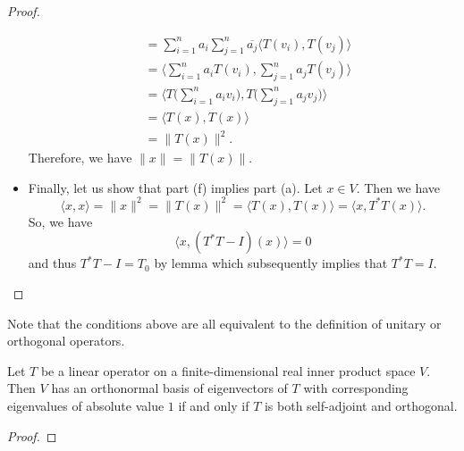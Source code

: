 \begin{proof}
\begin{itemize}
\begin{align*}
                          &= \sum_{ i=1  }^{ n } {a}_{i} \sum_{ j=1  }^{ n } \overline{{a}_{j}} \langle T({v}_{i}) , T({v}_{j}) \rangle \\
                          &= \Big\langle \sum_{ i=1  }^{ n } {a}_{i} T({v}_{i}),  \sum_{ j=1 }^{  n } {a}_{j} T({v}_{j}) \Big\rangle \\
                          &= \Big\langle T \Big(  \sum_{ i=1  }^{ n } {a}_{i} {v}_{i} \Big), T \Big(  \sum_{ j=1  }^{ n } {a}_{j} {v}_{j} \Big)  \Big\rangle \\
                          &= \langle T(x) , T(x) \rangle \\
                          &= \|T(x)\|^{2}.
            \end{align*}
            Therefore, we have \( \|x\| = \|T(x)\| \).
        \item Finally, let us show that part (f) implies part (a). Let \( x \in V  \). Then we have  
            \[  \langle x  ,  x  \rangle = \|x\|^{2} = \|T(x)\|^{2} = \langle T(x) , T(x) \rangle = \langle x  , T^{*}T(x) \rangle. \]
            So, we have
            \[  \langle x  , (T^{*}T - I) (x) \rangle = 0  \]
            and thus \( T^{*}T - I = {T}_{0} \) by lemma which subsequently implies that \( T^{*}T = I  \).
    \end{itemize}
\end{proof}
Note that the conditions above are all equivalent to the definition of unitary or orthogonal operators.

\begin{corollary}
    Let \( T  \) be a linear operator on a finite-dimensional real inner product space \( V  \). Then \( V  \) has an orthonormal basis of eigenvectors of \( T  \) with corresponding eigenvalues of absolute value \( 1  \) if and only if \( T  \) is both self-adjoint and orthogonal.
\end{corollary}
\begin{proof}

\end{proof}
